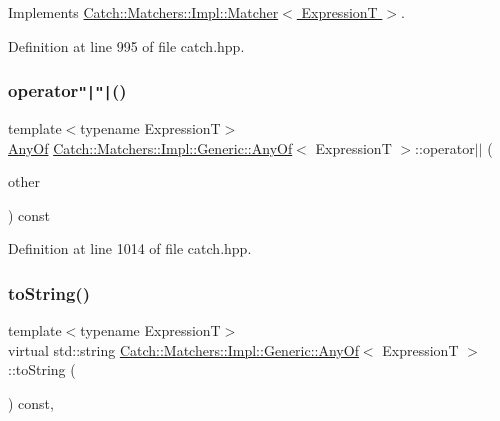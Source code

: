 Implements \hyperlink{struct_catch_1_1_matchers_1_1_impl_1_1_matcher_a8c1c5511ce1f3738a45e6901b558f583}{Catch\+::\+Matchers\+::\+Impl\+::\+Matcher$<$ Expression\+T $>$}.



Definition at line 995 of file catch.\+hpp.

\hypertarget{class_catch_1_1_matchers_1_1_impl_1_1_generic_1_1_any_of_a6dc9aee9a816f66ddc9de0c45c1c9ac1}{}\label{class_catch_1_1_matchers_1_1_impl_1_1_generic_1_1_any_of_a6dc9aee9a816f66ddc9de0c45c1c9ac1} 
\subsubsection{\texorpdfstring{operator\texttt{"|}\texttt{"|}()}{operator||()}}
{\footnotesize\ttfamily template$<$typename ExpressionT$>$ \\
\hyperlink{class_catch_1_1_matchers_1_1_impl_1_1_generic_1_1_any_of}{Any\+Of} \hyperlink{class_catch_1_1_matchers_1_1_impl_1_1_generic_1_1_any_of}{Catch\+::\+Matchers\+::\+Impl\+::\+Generic\+::\+Any\+Of}$<$ ExpressionT $>$\+::operator$\vert$$\vert$ (\begin{DoxyParamCaption}\item[{\hyperlink{struct_catch_1_1_matchers_1_1_impl_1_1_matcher}{Matcher}$<$ ExpressionT $>$ const \&}]{other }\end{DoxyParamCaption}) const\hspace{0.3cm}{\ttfamily [inline]}}



Definition at line 1014 of file catch.\+hpp.

\hypertarget{class_catch_1_1_matchers_1_1_impl_1_1_generic_1_1_any_of_a331aaf012b133682eadc9ed5342f848a}{}\label{class_catch_1_1_matchers_1_1_impl_1_1_generic_1_1_any_of_a331aaf012b133682eadc9ed5342f848a} 
\subsubsection{\texorpdfstring{to\+String()}{toString()}}
{\footnotesize\ttfamily template$<$typename ExpressionT$>$ \\
virtual std\+::string \hyperlink{class_catch_1_1_matchers_1_1_impl_1_1_generic_1_1_any_of}{Catch\+::\+Matchers\+::\+Impl\+::\+Generic\+::\+Any\+Of}$<$ ExpressionT $>$\+::to\+String (\begin{DoxyParamCaption}{ }\end{DoxyParamCaption}) const\hspace{0.3cm}{\ttfamily [inline]}, {\ttfamily [virtual]}}



